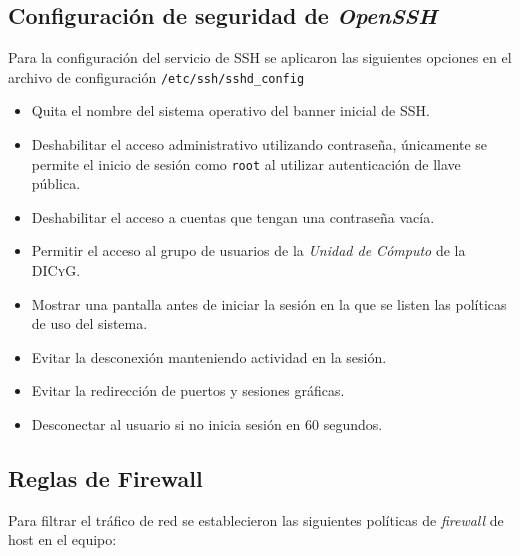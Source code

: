       \subsection {Configuraci\'{o}n de seguridad de \textsl{OpenSSH}}

Para la configuraci\'{o}n del servicio de \textsc{SSH} se aplicaron las siguientes opciones en el archivo de configuraci\'{o}n \texttt{/etc/ssh/sshd\_config}

\begin{itemize}
  \item Quita el nombre del sistema operativo del banner inicial de \textsc{SSH}.
  \item Deshabilitar el acceso administrativo utilizando contrase\~{n}a, \'{u}nicamente se permite el inicio de sesi\'{o}n como \texttt{root} al utilizar autenticaci\'{o}n de llave p\'{u}blica.
  \item Deshabilitar el acceso a cuentas que tengan una contrase\~{n}a vac\'{i}a.
  \item Permitir el acceso al grupo de usuarios de la \textit{Unidad de C\'{o}mputo} de la \textsc{DICyG}.
  \item  Mostrar una pantalla antes de iniciar la sesi\'{o}n en la que se listen las pol\'{i}ticas de uso del sistema.
  \item Evitar la desconexi\'{o}n manteniendo actividad en la sesi\'{o}n.
  \item Evitar la redirecci\'{o}n de puertos y sesiones gr\'{a}ficas.
  \item Desconectar al usuario si no inicia sesi\'{o}n en 60 segundos.
\end{itemize}

      \subsection {Reglas de Firewall}
      \label{subsec:fw-rules}

Para filtrar el tr\'{a}fico de red se establecieron las siguientes pol\'{i}ticas de \textit{firewall} de host en el equipo:

